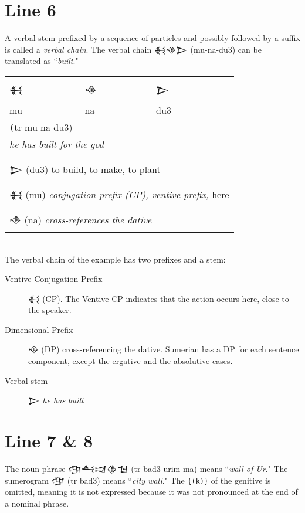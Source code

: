 \documentclass[a4paper,12pt]{book}
\newcommand{\fcn}{\setmainfont{Akkadian.otf}}
\begin{document}
\newpage
\section{Line 6}
A verbal stem prefixed by a sequence of
particles and possibly followed by a suffix
is called a {\em verbal chain}. The verbal
chain {\fcn 𒈬𒈾𒆕} (mu-na-du3) can be translated
as ``{\em built}."\\

\begin{tabular}[!h]{l l l}
\fcn\Large 𒈬
&\fcn\Large 𒈾 &\fcn\Large 𒆕\\
  mu & na & du3\\
\multicolumn{3}{l}{\texttt (tr mu na du3)}\\
\multicolumn{3}{l}{\em he has built for the god}\\
\hline\\
\multicolumn{3}{l}{{\fcn 𒆕}
                    (du3) to build, to make, to plant }\\
\multicolumn{3}{l}{{\fcn 𒈬}
  (mu) {\em conjugation prefix (CP), ventive prefix,}
            here}\\
\multicolumn{3}{l}{{\fcn 𒈾}
                    (na) {\em cross-references the dative} }\\
\end{tabular}


\verb||\\
The verbal chain of the example has two
prefixes and a stem:\\

\begin{description}
\item[Ventive Conjugation Prefix] {\fcn 𒈬}   (CP).
  The Ventive CP indicates that the action occurs
  here, close to the speaker.
\item[Dimensional Prefix] {\fcn 𒈾}
  (DP) cross-referencing
  the dative. Sumerian has a DP for each sentence component,
  except the ergative and the absolutive cases.
\item[Verbal stem] {\fcn 𒆕}  {\em he has built}
\end{description}

\section{Line 7 \& 8}
The noun phrase {\fcn 𒂦𒋀𒀕𒆠𒈠}
(tr bad3 urim ma) means ``{\em wall of Ur}."
The sumerogram {\fcn 𒂦} (tr bad3) means
``{\em city wall}." The \verb|{(k)}| of the
genitive is omitted, meaning it is not expressed
because it was not pronounced at
the end of a nominal phrase.\\
\end{document}
